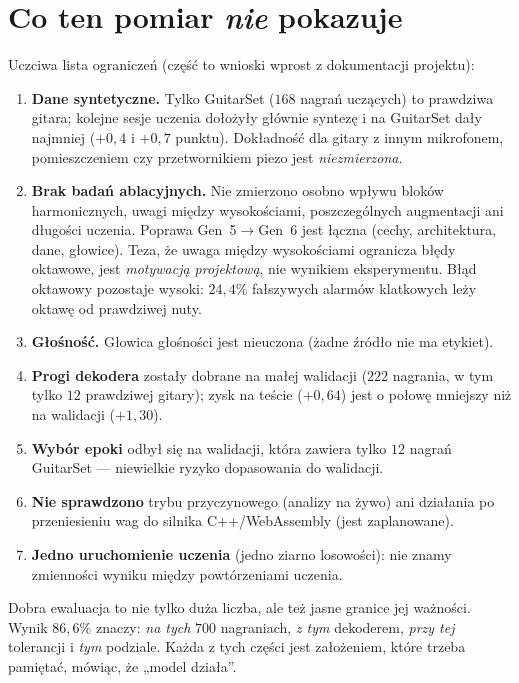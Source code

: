 \section{Co ten pomiar \emph{nie} pokazuje}

Uczciwa lista ograniczeń (część to wnioski wprost z dokumentacji projektu):
\begin{enumerate}
\item \textbf{Dane syntetyczne.} Tylko GuitarSet ($168$ nagrań uczących) to prawdziwa gitara; kolejne sesje uczenia dołożyły głównie syntezę i na GuitarSet dały najmniej ($+0{,}4$ i $+0{,}7$ punktu). Dokładność dla gitary z innym mikrofonem, pomieszczeniem czy przetwornikiem piezo jest \emph{niezmierzona}.
\item \textbf{Brak badań ablacyjnych.} Nie zmierzono osobno wpływu bloków harmonicznych, uwagi między wysokościami, poszczególnych augmentacji ani długości uczenia. Poprawa Gen~5$\to$Gen~6 jest łączna (cechy, architektura, dane, głowice). Teza, że uwaga między wysokościami ogranicza błędy oktawowe, jest \emph{motywacją projektową}, nie wynikiem eksperymentu.
Błąd oktawowy pozostaje wysoki: $24{,}4\%$ fałszywych alarmów klatkowych leży oktawę od prawdziwej nuty.
\item \textbf{Głośność.} Głowica głośności jest nieuczona (żadne źródło nie ma etykiet).
\item \textbf{Progi dekodera} zostały dobrane na małej walidacji ($222$ nagrania, w tym tylko $12$ prawdziwej gitary); zysk na teście ($+0{,}64$) jest o połowę mniejszy niż na walidacji ($+1{,}30$).
\item \textbf{Wybór epoki} odbył się na walidacji, która zawiera tylko $12$ nagrań GuitarSet --- niewielkie ryzyko dopasowania do walidacji.
\item \textbf{Nie sprawdzono} trybu przyczynowego (analizy na żywo) ani działania po przeniesieniu wag do silnika C++/WebAssembly (jest zaplanowane).
\item \textbf{Jedno uruchomienie uczenia} (jedno ziarno losowości): nie znamy zmienności wyniku między powtórzeniami uczenia.
\end{enumerate}

\begin{intuicja}
Dobra ewaluacja to nie tylko duża liczba, ale też jasne granice jej ważności. Wynik $86{,}6\%$ znaczy: \emph{na tych} $700$ nagraniach, \emph{z tym} dekoderem, \emph{przy tej} tolerancji i \emph{tym} podziale. Każda z tych części jest założeniem, które trzeba pamiętać, mówiąc, że „model działa”.
\end{intuicja}

